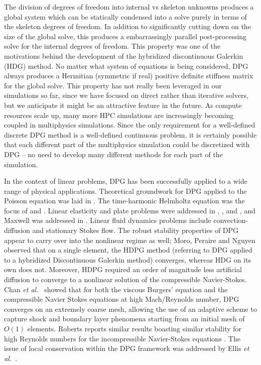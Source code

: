 \documentclass[letterpaper]{article}
\def\etal{{\it et al.~}}
\begin{document}
The division of degrees of freedom into internal vs skeleton unknowns produces a global system which can be statically condensed into 
a solve purely in terms of the skeleton degrees of freedom.
In addition to significantly cutting down on the size of the global solve, 
this produces a embarrassingly parallel post-processing solve for the internal degrees of freedom.
This property was one of the motivations behind the development of the hybridized discontinuous Galerkin (HDG) \cite{HDG} method.
No matter what system of equations is being considered, DPG always produces a Hermitian (symmetric if real) 
positive definite stiffness matrix for the global solve.
This property has not really been leveraged in our simulations so far, since we have focused on direct rather than iterative solvers, but we
anticipate it might be an attractive feature in the future.
As compute resources scale up, many more HPC simulations are increasingly becoming coupled in multiphysics simulations.
Since the only requirement for a well-defined discrete DPG method is a well-defined continuous problem, it is certainly possible that each different part of the multiphysics simulation could be discretized with DPG -- no need to develop many different methods for each part of the simulation.

In the context of linear problems, DPG has been successfully applied to a wide range of physical applications.  
Theoretical groundwork for DPG applied to the Poisson equation was laid in \cite{DPGPoisson}.  The time-harmonic Helmholtz equation was the focus of \cite{DPGHelmholtz, Gopalakrishnan2014} and \cite{DPG4}.  Linear elasticity and plate problems were addressed in \cite{BramwellDPG}, \cite{NiemiBramwellDemkowicz10}, and \cite{BramwellDemkowiczQiu10}, and Maxwell was addressed in \cite{DPGCloaking, WohlmuthReport}.  Linear fluid dynamics problems include convection-diffusion \cite{DPG3,DemkowiczHeuer,ChanHeuerThanhDemkowicz2012,Chan2013,EllisLC} and stationary Stokes flow\cite{DPGStokes,EllisLC}.
The robust stability properties of DPG appear to carry over into the nonlinear regime as well; Moro, Peraire and Nguyen observed \cite{MoroNguyenPeraire11, MoroMastersThesis} that on a single element, the HDPG method (referring to DPG applied to a hybridized Discontinuous Galerkin method) converges, whereas HDG on its own does not.  Moreover, HDPG required an order of magnitude less artificial diffusion to converge to a nonlinear solution of the compressible Navier-Stokes.  Chan \etal \cite{Chan2013dpg} showed that for both the viscous Burgers' equation and the compressible Navier Stokes equations at high Mach/Reynolds number, DPG converges on an extremely coarse mesh, allowing the use of an adaptive scheme to capture shock and boundary layer phenomena starting from an initial mesh of $O(1)$ elements.  Roberts reports similar results boasting similar stability for high Reynolds numbers for the incompressible Navier-Stokes equations \cite{NateDissertation}.  
The issue of local conservation within the DPG framework was addressed by Ellis \etal \cite{EllisLC}.
\end{document}
